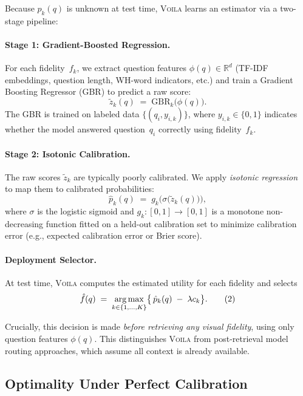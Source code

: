 Because $p_k(q)$ is unknown at test time,
\textsc{Voila} learns an estimator via a two-stage pipeline:

\paragraph{Stage 1: Gradient-Boosted Regression.}
For each fidelity~$f_k$, we extract question features $\phi(q) \in \mathbb{R}^d$
(TF-IDF embeddings, question length, WH-word indicators, etc.)
and train a Gradient Boosting Regressor (GBR) to predict a raw score:
\[
\tilde z_k(q) \;=\; \text{GBR}_k\bigl(\phi(q)\bigr).
\]
The GBR is trained on labeled data $\{(q_i, y_{i,k})\}$, where $y_{i,k} \in \{0,1\}$ indicates
whether the model answered question~$q_i$ correctly using fidelity~$f_k$.

\paragraph{Stage 2: Isotonic Calibration.}
The raw scores $\tilde z_k$ are typically poorly calibrated. We apply
\emph{isotonic regression}~\cite{nuesch1991order}
to map them to calibrated probabilities:
\[
\hat p_k(q)\;=\;
g_k\!\bigl(\sigma\!\bigl(\tilde z_k(q)\bigr)\bigr),
\]
where $\sigma$ is the logistic sigmoid and $g_k: [0,1] \to [0,1]$ is a monotone non-decreasing
function fitted on a held-out calibration set to minimize calibration error
(e.g., expected calibration error or Brier score).

\paragraph{Deployment Selector.}
At test time, \textsc{Voila} computes the estimated utility for each fidelity and selects
\begin{equation}
\hat f(q)
\;=\;
\operatorname*{arg\,max}_{k \in \{1,\dots,K\}}
\bigl\{\,
\hat p_k(q)\;-\;\lambda c_k
\bigr\}.
\tag{2}
\label{eq:voila_selector}
\end{equation}

Crucially, this decision is made \emph{before retrieving any visual fidelity}, using only
question features $\phi(q)$. This distinguishes \textsc{Voila} from post-retrieval model
routing approaches, which assume all context is already available.

\vspace{-0.3em}
\subsection{Optimality Under Perfect Calibration}
\label{sec:optimality}

